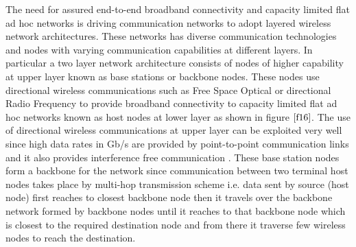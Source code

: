 \documentclass[11pt]{article}
\numberwithin{equation}{section}
\begin{document}
The need for assured end-to-end broadband connectivity and capacity limited flat ad hoc networks is driving communication networks to adopt layered wireless network architectures. These networks has diverse communication technologies and nodes with varying communication capabilities at different layers. In particular a two layer network architecture consists of nodes of higher capability at upper layer known as base stations or backbone nodes. These nodes use directional wireless communications such as Free Space Optical or directional Radio Frequency to provide broadband connectivity to capacity limited flat ad hoc networks known as host nodes at lower layer as shown in figure $\ref{f16}$. The use of directional wireless communications at upper layer can be exploited very well since high data rates in Gb/s are provided by point-to-point communication links and it also provides interference free communication \cite{dh,sd,sl}. These base station nodes form a backbone for the network since communication between two terminal host nodes takes place by multi-hop transmission scheme i.e. data sent by source (host node) first reaches to closest backbone node then it travels over the backbone network formed by backbone nodes until it reaches to that backbone node which is closest to the required destination node and from there it traverse few wireless nodes to reach the destination. \\
\end{document}

